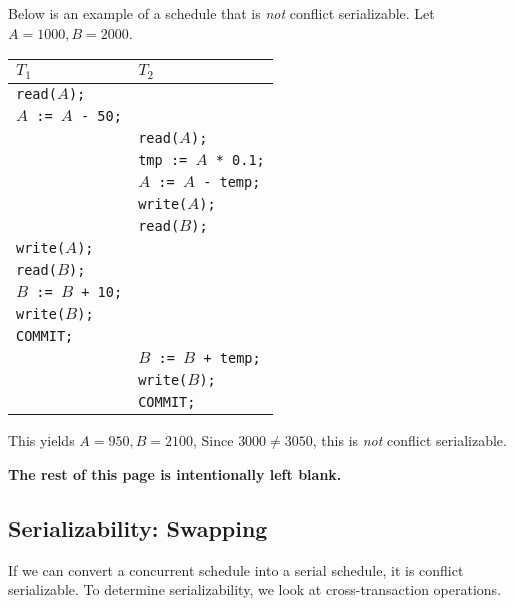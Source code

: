 \documentclass{report}
\newenvironment{example}{\begin{tcolorbox}[title={Example},colback=green!5!white,colframe=black!75!green]}{\end{tcolorbox}}
\renewcommand{\bf}[1]{\textbf{{#1}}}
\renewcommand{\tt}[1]{\texttt{{#1}}}
\renewcommand{\it}[1]{\textit{{#1}}}
\begin{document}
\begin{example}
    Below is an example of a schedule that is \it{not} conflict serializable. Let
    $A = 1000, B = 2000$.

    {
        \centering
        \begin{tabular}{l|l}
            $T_1$ & $T_2$ \\
            \hline
            \tt{read($A$);} & \\
            \tt{$A$ := $A$ - 50;} & \\
                                  & \tt{read($A$);} \\
                                  & \tt{tmp := $A$ * 0.1;} \\
                                  & \tt{$A$ := $A$ - temp;} \\
                                  & \tt{write($A$);} \\
                                  & \tt{read($B$);} \\
            \tt{write($A$);} & \\
            \tt{read($B$);} & \\
            \tt{$B$ := $B$ + 10;} & \\
            \tt{write($B$);} & \\
            \tt{COMMIT;} & \\
                         & \tt{$B$ := $B$ + temp;} \\
                         & \tt{write($B$);} \\
                         & \tt{COMMIT;} \\
        \end{tabular}
        \par
    }
    This yields $A = 950, B = 2100$, Since $3000 \neq 3050$, this is \it{not}
    conflict serializable.
\end{example}
\vspace{5em}

\begin{center}
    \bf{The rest of this page is intentionally left blank.}
\end{center}

\newpage
\subsection{Serializability: Swapping}
If we can convert a concurrent schedule into a serial schedule, it is
conflict serializable. To determine serializability, we look at
cross-transaction operations.
\end{document}
